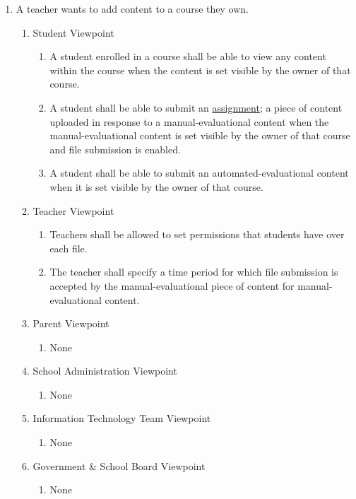 \documentclass[]{article}
\begin{document}
\begin{enumerate}[{BE}1.]
	\item A teacher wants to add content to a course they own.
	\begin{enumerate}[{VP1}.1]
		\item Student Viewpoint
			\begin{enumerate}
				\item A student enrolled in a course shall be able to view any content 
within
the course when the content is set visible by the owner of that course.
				\item A student shall be able to submit an \underline{assignment}; a
piece of content uploaded in response to a manual-evaluational content when
the manual-evaluational content is set visible by the owner of that course and
file submission is enabled.
				\item A student shall be able to submit an automated-evaluational content
when it is set visible by the owner of that course.
			\end{enumerate}
		\item Teacher Viewpoint
			\begin{enumerate}
				\item Teachers shall be allowed to set permissions that students have over 
each file.
				\item The
teacher shall specify a time period for which file submission is accepted by
the manual-evaluational piece of content for manual-evaluational content.
			\end{enumerate}
		\item Parent Viewpoint
			\begin{enumerate}
				\item None
			\end{enumerate}
		\item School Administration Viewpoint
			\begin{enumerate}
				\item None
			\end{enumerate}
		\item Information Technology Team Viewpoint
			\begin{enumerate}
				\item None
			\end{enumerate}
		\item Government \& School Board Viewpoint
			\begin{enumerate}
				\item None
			\end{enumerate}
	\end{enumerate}


\end{enumerate}
\end{document}
